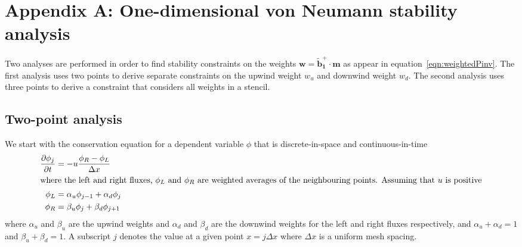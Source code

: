 \section*{Appendix A: One-dimensional von Neumann stability analysis}
Two analyses are performed in order to find stability constraints on the weights $\mathbf{w} = \mathbf{\tilde{b}_1^+} \cdot \mathbf{m}$ as appear in equation~\eqref{eqn:weightedPinv}.  The first analysis uses two points to derive separate constraints on the upwind weight $w_u$ and downwind weight $w_d$.  The second analysis uses three points to derive a constraint that considers all weights in a stencil.

\subsection*{Two-point analysis}
We start with the conservation equation for a dependent variable $\phi$ that is discrete-in-space and continuous-in-time
\begin{align}
\frac{\partial \phi_j}{\partial t} &= - u \frac{\phi_R - \phi_L}{\Delta x} \label{eqn:advectionLR} \\
%
\shortintertext{where the left and right fluxes, $\phi_L$ and $\phi_R$ are weighted averages of the neighbouring points.  Assuming that $u$ is positive}
%
\phi_L &= \alpha_u \phi_{j-1} + \alpha_d \phi_j \\
\phi_R &= \beta_u \phi_j + \beta_d \phi_{j+1}
\end{align}
where $\alpha_u$ and $\beta_u$ are the upwind weights and $\alpha_d$ and $\beta_d$ are the downwind weights for the left and right fluxes respectively, and $\alpha_u + \alpha_d = 1$ and $\beta_u + \beta_d = 1$.  A subscript $j$ denotes the value at a given point $x = j \Delta x$ where $\Delta x$ is a uniform mesh spacing.

